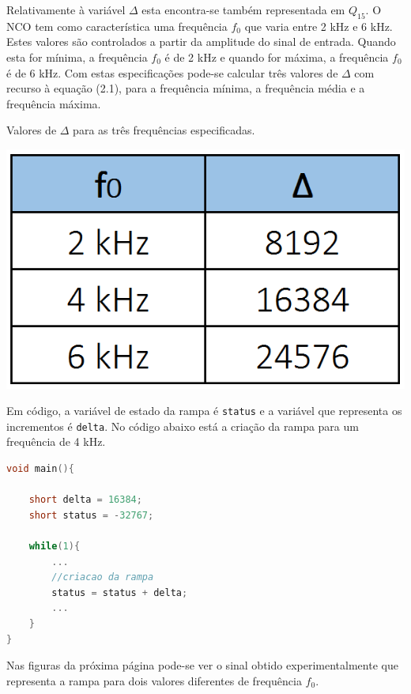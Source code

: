 \documentclass[11pt]{article}
\numberwithin{equation}{section}
\begin{document}
Relativamente à variável $\Delta$ esta encontra-se também representada em $Q_{15}$. O NCO tem como característica uma frequência $f_{0}$ que varia entre 2 kHz e 6 kHz. Estes valores são controlados a partir da amplitude do sinal de entrada. Quando esta for mínima, a frequência $f_{0}$ é de 2 kHz e quando for máxima, a frequência $f_{0}$ é de 6 kHz. Com estas especificações pode-se calcular três valores de $\Delta$ com recurso à equação (2.1), para a frequência mínima, a frequência média e a frequência máxima.

\begin{table}[H]
	\centering
	\caption{Valores de $\Delta$ para as três frequências especificadas.}
	\vspace{-1.5mm}
	\includegraphics[keepaspectratio=true, scale=0.45]{tabelas/tabela2}
\end{table}

Em código, a variável de estado da rampa é \texttt{status} e a variável que representa os incrementos é \texttt{delta}. No código abaixo está a criação da rampa para um frequência de 4 kHz.

\begin{lstlisting}[language=C]
void main(){

	short delta = 16384;
	short status = -32767;

	while(1){
		...	
		//criacao da rampa	
		status = status + delta;
		...
	}
}
\end{lstlisting}

Nas figuras da próxima página pode-se ver o sinal obtido experimentalmente que representa a rampa para dois valores diferentes de frequência $f_{0}$.
\end{document}
